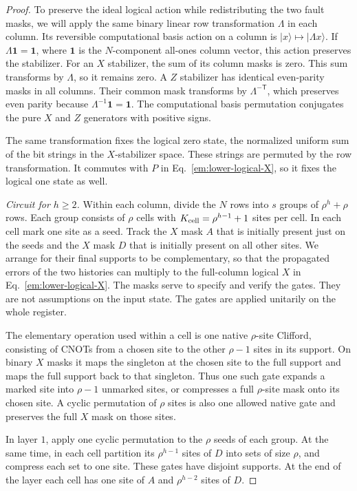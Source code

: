 \documentclass[aps,prl,reprint,longbibliography,nofootinbib,nobibnotes]{revtex4-2}
\begin{document}
\begin{proof}
To preserve the ideal logical action while redistributing the two fault masks, we will apply the
same binary linear row transformation $\Lambda$ in each column. Its reversible computational basis
action on a column is $|x\rangle\mapsto|\Lambda x\rangle$. If $\Lambda\mathbf 1=\mathbf 1$, where
$\mathbf 1$ is the $N$-component all-ones column vector, this action preserves the stabilizer. For
an $X$ stabilizer, the sum of its column masks is zero. This sum transforms by $\Lambda$, so it
remains zero. A $Z$ stabilizer has identical even-parity masks in all columns. Their common mask
transforms by $\Lambda^{-\mathsf T}$, which preserves even parity because $\Lambda^{-1}\mathbf
1=\mathbf 1$. The computational basis permutation conjugates the pure $X$ and $Z$ generators with
positive signs.

The same transformation fixes the logical zero state, the normalized uniform sum of the bit strings
in the $X$-stabilizer space. These strings are permuted by the row transformation. It commutes with
$P$ in Eq.~\eqref{em:lower-logical-X}, so it fixes the logical one state as well.

\emph{Circuit for $h\ge2$.}
Within each column, divide the $N$ rows into $s$ groups of $\rho^h+\rho$ rows. Each group consists
of $\rho$ cells with $K_{\rm cell}=\rho^{h-1}+1$ sites per cell. In each cell mark one site as a
seed. Track the $X$ mask $A$ that is initially present just on the seeds and the $X$ mask $D$ that
is initially present on all other sites. We arrange for their final supports to be complementary,
so that the propagated errors of the two histories can multiply to the full-column logical $X$ in
Eq.~\eqref{em:lower-logical-X}. The masks serve to specify and verify the gates. They are not
assumptions on the input state. The gates are applied unitarily on the whole register.

The elementary operation used within a cell is one native $\rho$-site Clifford, consisting of CNOTs
from a chosen site to the other $\rho-1$ sites in its support. On binary $X$ masks it maps the
singleton at the chosen site to the full support and maps the full support back to that singleton.
Thus one such gate expands a marked site into $\rho-1$ unmarked sites, or compresses a full
$\rho$-site mask onto its chosen site. A cyclic permutation of $\rho$ sites is also one allowed
native gate and preserves the full $X$ mask on those sites.

In layer $1$, apply one cyclic permutation to the $\rho$ seeds of each group. At the same time, in
each cell partition its $\rho^{h-1}$ sites of $D$ into sets of size $\rho$, and compress each set
to one site. These gates have disjoint supports. At the end of the layer each cell has one site of
$A$ and $\rho^{h-2}$ sites of $D$.


\end{proof}
\end{document}
